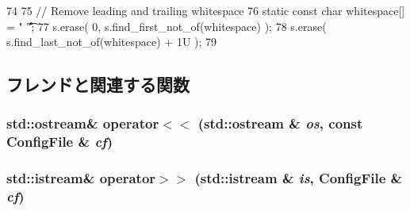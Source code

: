 \begin{DoxyCode}
74 {
75     // Remove leading and trailing whitespace
76     static const char whitespace[] = " \n\t\v\r\f";
77     s.erase( 0, s.find_first_not_of(whitespace) );
78     s.erase( s.find_last_not_of(whitespace) + 1U );
79 }
\end{DoxyCode}


\subsection{フレンドと関連する関数}
\hypertarget{classConfigFile_a8ccacbc37db1992a5515e2c72fc83ce6}{
\subsubsection[{operator$<$$<$}]{\setlength{\rightskip}{0pt plus 5cm}std::ostream\& operator$<$$<$ (std::ostream \& {\em os}, \/  const {\bf ConfigFile} \& {\em cf})}}
\label{classConfigFile_a8ccacbc37db1992a5515e2c72fc83ce6}
\hypertarget{classConfigFile_a25042475439039e70f90febe7d0e63ec}{
\subsubsection[{operator$>$$>$}]{\setlength{\rightskip}{0pt plus 5cm}std::istream\& operator$>$$>$ (std::istream \& {\em is}, \/  {\bf ConfigFile} \& {\em cf})}}
\label{classConfigFile_a25042475439039e70f90febe7d0e63ec}


